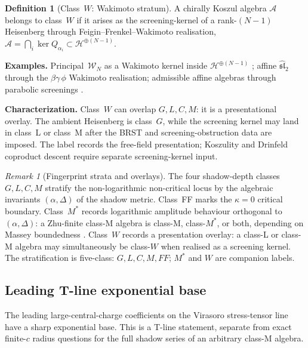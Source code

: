 \documentclass[11pt]{article}
\theoremstyle{plain}
\theoremstyle{definition}
\newtheorem{definition}[theorem]{Definition}
\theoremstyle{remark}
\newtheorem{remark}[theorem]{Remark}
\providecommand{\cA}{\mathcal{A}}
\providecommand{\cH}{\mathcal{H}}
\providecommand{\cW}{\mathcal{W}}
\begin{document}
\begin{definition}[Class~$W$: Wakimoto stratum]
\label{def:class-W}
A chirally Koszul algebra $\cA$ belongs to class~$W$ if it
arises as the screening-kernel of a rank-$(N-1)$ Heisenberg
through Feigin--Frenkel--Wakimoto realisation,
$\cA = \bigcap_i \ker Q_{\alpha_i} \subset \cH^{\oplus(N-1)}$.
\end{definition}

\noindent\textbf{Examples.} Principal~$\cW_N$ as a Wakimoto
kernel inside $\cH^{\oplus (N-1)}$
\cite{Frenkel-Kac-Wakimoto92,FP03}; affine
$\widehat{\mathfrak{sl}}_2$ through the $\beta\gamma\,\phi$
Wakimoto realisation; admissible affine algebras through parabolic
screenings \cite{KRW03,Arakawa07}.

\noindent\textbf{Characterization.}
Class~$W$ can overlap $G,L,C,M$: it is a presentational overlay.
The ambient Heisenberg is class~$G$, while the screening
kernel may land in class~L or class~M after the BRST and
screening-obstruction data are imposed. The label records the
free-field presentation; Koszulity and Drinfeld coproduct descent
require separate screening-kernel input.

\begin{remark}[Fingerprint strata and overlays]
\label{rem:full-stratification}
The four shadow-depth classes $G, L, C, M$ stratify the
non-logarithmic non-critical locus by the algebraic invariants
$(\alpha, \Delta)$ of the shadow metric. Class~FF marks the
$\kappa = 0$ critical boundary. Class~$M^\ast$ records logarithmic
amplitude behaviour orthogonal to $(\alpha, \Delta)$: a
Zhu-finite class-M algebra is class-M, class-$M^\ast$, or both,
depending on Massey boundedness
\cite{Gurarie1993,Flohr1996}.
Class~$W$ records a presentation overlay: a class-L or class-M
algebra may simultaneously be class-$W$ when realised as a
screening kernel. The stratification is five-class:
$G,L,C,M,FF$; $M^\ast$ and $W$ are companion labels.
\end{remark}

\subsection{Leading T-line exponential base}
\label{ssec:universal-C-A-6}

The leading large-central-charge coefficients on the Virasoro
stress-tensor line have a sharp exponential base. This is a
T-line statement, separate from exact finite-$c$ radius questions for
the full shadow series of an arbitrary class-M algebra.
\end{document}
